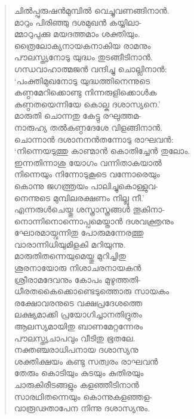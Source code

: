 \begin{verse}
ചില്‍പ്പുരുഷന്‍മുമ്പില്‍ വെച്ചുവണങ്ങിനാന്‍.\\
മാറും പിരിഞ്ഞു ദശമുഖന്‍ കയ്യിലാ-\\
മ്മാറുപുക്കു മയദത്തമാം ശക്തിയും.\\
ത്രൈലോക്യനായകനാകിയ രാമനും\\
പൗലസ്ത്യനോടു യുദ്ധം തുടങ്ങീടിനാന്‍.\\
ഗന്ധവാഹാത്മജന്‍ വന്ദിച്ചു ചൊല്ലിനാന്‍:\\
‘പംക്തിമുഖനോടു യുദ്ധത്തിനെന്നുടെ\\
കണ്ഠമേറിക്കൊണ്ടു നിന്നരുളിക്കൊള്‍ക\\
കുണ്ഠതയെന്നിയേ കൊല്ക ദശാസ്യനെ.’\\
മാരുതി ചൊന്നതു കേട്ടു രഘുത്തമ-\\
നാരുഹ്യ തല്‍കണ്ഠദേശേ വിളങ്ങിനാന്‍.\\
ചൊന്നാന്‍ ദശാനനന്‍തന്നോടു രാഘവന്‍:\\
‘നിന്നെയടുത്തു കാണ്മാന്‍ കൊതിച്ചേന്‍ തുലോം.\\
ഇന്നതിന്നാശു യോഗം വന്നിതാകയാല്‍\\
നിന്നെയും നിന്നോടുകൂടെ വന്നോരെയും\\
കൊന്നു ജഗത്ത്രയം പാലിച്ചുകൊള്ളുവ-\\
നെന്നുടെ മുമ്പിലരക്ഷണം നില്ലു നീ.’\\
എന്നരുള്‍ചെയ്തു ശസ്ത്രാസ്ത്രങ്ങള്‍ തൂകിനാ-\\
നൊന്നിനൊന്നൊപ്പമെയ്താന്‍ ദശവക്ത്രനും\\
ഘോരമായ്വന്നിതു പോരുമന്നേരത്തു\\
വാരാന്നിധിയുമിളകി മറിയുന്നു.\\
മാരുതിതന്നെയുമെയ്തു മുറിച്ചിതു\\
ശൂരനായോരു നിശാചരനായകന്‍\\
ശ്രീരാമദേവനും കോപം മുഴുത്തതി-\\
ധീരതകൈക്കൊണ്ടെടുത്തൊരു സായകം\\
രക്ഷോവരനുടെ വക്ഷപ്രദേശത്തെ\\
ലക്ഷ്യമാക്കി പ്രയോഗിച്ചാനതിദ്രുതം\\
ആലസ്യമായിതു ബാണമേറ്റന്നേരം\\
പൗലസ്ത്യചാപവും വീടിതു ഭൂതലേ.\\
നക്തഞ്ചരാധിപനായ ദശാസ്യനു\\
ശക്തിക്ഷയം കണ്ടു സത്വരം രാഘവന്‍\\
തേരും കൊടിയും കുടയും കുതിരയും\\
ചാരുകിരീടങ്ങളും കളഞ്ഞീടിനാന്‍\\
സാരഥിതന്നെയും കൊന്നുകളഞ്ഞള-\\
വാരൂഢതാപേന നിന്നു ദശാസ്യനും.\\

\end{verse}
